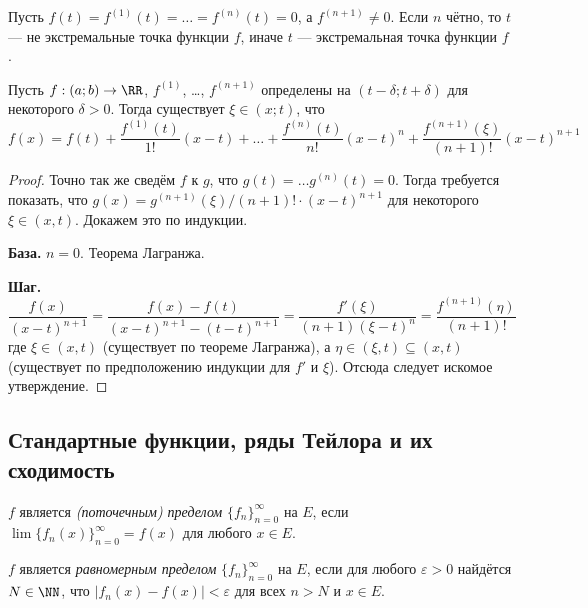 \documentclass[12pt,a4paper]{article}
\begin{document}
    \begin{theorem}
        Пусть $f(t) = f^{(1)}(t) = \dots = f^{(n)}(t) = 0$, а $f^{(n+1)} \neq 0$. Если $n$ чётно, то $t$ --- не экстремальные точка функции $f$, иначе $t$ --- экстремальная точка функции $f$.
    \end{theorem}

    \begin{theorem}
        Пусть $f: (a; b) \to \RR$, $f^{(1)}$, \dots, $f^{(n+1)}$ определены на $(t-\delta; t+\delta)$ для некоторого $\delta > 0$. Тогда существует $\xi \in (x; t)$, что
        \[f(x) = f(t) + \frac{f^{(1)}(t)}{1!}(x-t) + \dots + \frac{f^{(n)}(t)}{n!}(x-t)^n + \frac{f^{(n+1)}(\xi)}{(n+1)!}(x-t)^{n+1}\]
    \end{theorem}

    \begin{proof}
        Точно так же сведём $f$ к $g$, что $g(t) = \dots g^{(n)}(t) = 0$. Тогда требуется показать, что $g(x) = g^{(n+1)}(\xi)/(n+1)! \cdot (x-t)^{n+1}$ для некоторого $\xi \in (x, t)$. Докажем это по индукции.

        \textbf{База.} $n=0$. Теорема Лагранжа.

        \textbf{Шаг.}
        \[\frac{f(x)}{(x-t)^{n+1}} = \frac{f(x) - f(t)}{(x-t)^{n+1} - (t-t)^{n+1}} = \frac{f'(\xi)}{(n+1)(\xi - t)^{n}} = \frac{f^{(n+1)}(\eta)}{(n+1)!}\]
        где $\xi \in (x, t)$ (существует по теореме Лагранжа), а $\eta \in (\xi, t) \subseteq (x, t)$ (существует по предположению индукции для $f'$ и $\xi$). Отсюда следует искомое утверждение.
    \end{proof}

    \subsection{Стандартные функции, ряды Тейлора и их сходимость}


    \begin{definition}
        $f$ является \emph{(поточечным) пределом} $\{f_n\}_{n=0}^\infty$ на $E$, если $\lim \{f_n(x)\}_{n=0}^\infty = f(x)$ для любого $x \in E$.
    \end{definition}

    \begin{definition}
        $f$ является \emph{равномерным пределом} $\{f_n\}_{n=0}^\infty$ на $E$, если для любого $\varepsilon > 0$ найдётся $N \in \NN$, что $|f_n(x) - f(x)| < \varepsilon$ для всех $n > N$ и $x \in E$.
    \end{definition}
\end{document}
